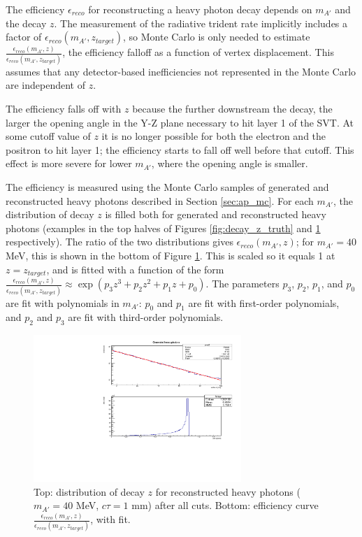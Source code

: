 The efficiency $\epsilon_{reco}$ for reconstructing a heavy photon decay depends on $m_{A'}$ and the decay $z$.
The measurement of the radiative trident rate implicitly includes a factor of $\epsilon_{reco}(m_{A'},z_{target})$, so Monte Carlo is only needed to estimate $\frac{\epsilon_{reco}(m_{A'},z)}{\epsilon_{reco}(m_{A'},z_{target})}$, the efficiency falloff as a function of vertex displacement.
This assumes that any detector-based inefficiencies not represented in the Monte Carlo are independent of $z$.

The efficiency falls off with $z$ because the further downstream the decay, the larger the opening angle in the Y-Z plane necessary to hit layer 1 of the SVT.
At some cutoff value of $z$ it is no longer possible for both the electron and the positron to hit layer 1; the efficiency starts to fall off well before that cutoff.
This effect is more severe for lower $m_{A'}$, where the opening angle is smaller.

The efficiency is measured using the Monte Carlo samples of generated and reconstructed heavy photons described in Section \ref{sec:ap_mc}.
For each $m_{A'}$, the distribution of decay $z$ is filled both for generated and reconstructed heavy photons (examples in the top halves of Figures \ref{fig:decay_z_truth} and \ref{fig:eff_z} respectively).
The ratio of the two distributions gives $\epsilon_{reco}(m_{A'},z)$; for $m_{A'}=40$ MeV, this is shown in the bottom of Figure \ref{fig:eff_z}.
This is scaled so it equals 1 at $z=z_{target}$, and is fitted with a function of the form $\frac{\epsilon_{reco}(m_{A'},z)}{\epsilon_{reco}(m_{A'},z_{target})} \approx \exp(p_3 z^3 + p_2 z^2 + p_1 z + p_0)$.
The parameters $p_3$, $p_2$, $p_1$, and $p_0$ are fit with polynomials in $m_{A'}$: $p_0$ and $p_1$ are fit with first-order polynomials, and $p_2$ and $p_3$ are fit with third-order polynomials.

\begin{figure}[ht]
\begin{center}
    \includegraphics[width=0.7\textwidth,page=2,angle=-90]{vertexing/figs/acceptance_40}
\end{center}
    \caption{Top: distribution of decay $z$ for reconstructed heavy photons ($m_{A'}=40$ MeV, $c\tau=1$ mm) after all cuts. Bottom: efficiency curve $\frac{\epsilon_{reco}(m_{A'},z)}{\epsilon_{reco}(m_{A'},z_{target})}$, with fit.}
    \label{fig:eff_z}
\end{figure}


